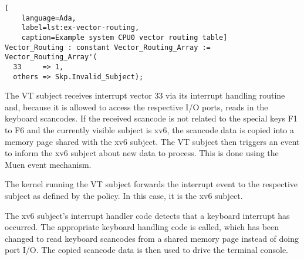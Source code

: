 \begin{lstlisting}[
	language=Ada,
	label=lst:ex-vector-routing,
	caption=Example system CPU0 vector routing table]
Vector_Routing : constant Vector_Routing_Array := Vector_Routing_Array'(
  33     => 1,
  others => Skp.Invalid_Subject);
\end{lstlisting}

The VT subject receives interrupt vector 33 via its interrupt handling routine
and, because it is allowed to access the respective I/O ports, reads in the
keyboard scancodes. If the received scancode is not related to the special keys
F1 to F6 and the currently visible subject is xv6, the scancode data is copied
into a memory page shared with the xv6 subject. The VT subject then triggers an
event to inform the xv6 subject about new data to process. This is done using
the Muen event mechanism.

The kernel running the VT subject forwards the interrupt event to the respective
subject as defined by the policy. In this case, it is the xv6 subject.

The xv6 subject's interrupt handler code detects that a keyboard interrupt has
occurred. The appropriate keyboard handling code is called, which has been
changed to read keyboard scancodes from a shared memory page instead of doing
port I/O. The copied scancode data is then used to drive the terminal console.
